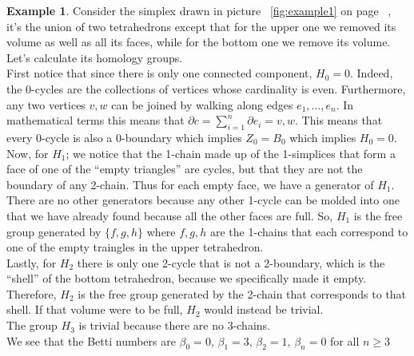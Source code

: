 \documentclass{article}
\theoremstyle{plain}
\theoremstyle{definition}
\newtheorem{example}{Example}[section]
\theoremstyle{remark}
\begin{document}
\begin{example}
Consider the simplex drawn in picture ~\ref{fig:example1} on page ~\pageref{fig:example1}, it's the union of two tetrahedrons except that for the upper one we removed its volume as well as all its faces, while for the bottom one we remove its volume.
Let’s calculate its homology groups. \\ First notice that since there is only one connected component, $H_0 = 0$. Indeed, the $0$-cycles are the collections of vertices whose cardinality is even. Furthermore, any two vertices $v,w$ can be joined by walking along edges $e_1, \dots, e_n$. In mathematical terms this means that $\partial c = \sum_{i=1}^n \partial e_i = {v,w}$. This means that every 0-cycle is also a 0-boundary which implies $Z_0 = B_0$ which implies $H_0 = 0$.\\
Now, for $H_1$; we notice that the 1-chain made up of the 1-simplices that form a face of one of the “empty triangles” are cycles, but that they are not the boundary of any 2-chain. Thus for each empty face, we have a generator of $H_1$. There are no other generators because any other 1-cycle can be molded into one that we have already found because all the other faces are full. So, $H_1$ is the free group generated by $\{f,g,h\}$ where $f,g,h$ are the 1-chains that each correspond to one of the empty traingles in the upper tetrahedron. \\
Lastly, for $H_2$ there is only one 2-cycle that is not a 2-boundary, which is the “shell” of the bottom tetrahedron, because we specifically made it empty. Therefore, $H_2$ is the free group generated by the 2-chain that corresponds to that shell. If that volume were to be full, $H_2$ would instead be trivial.\\
The group $H_3$ is trivial because there are no 3-chains. \\
We see that the Betti numbers are $\beta_0 = 0$, $\beta_1 = 3$, $\beta_2 = 1$, $\beta_n = 0$ for all $n \geq 3$

\begin{figure}[h!]
\end{figure}
\end{example}
\end{document}
